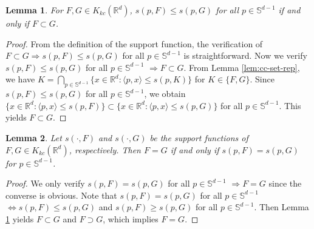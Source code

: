 \documentclass[11pt,reqno]{amsart}
\newtheorem{lemma}{Lemma}
\begin{document}
\begin{lemma}\label{lem:sf-ineq}
For $F,G \in K_{kc}(\mathbb{R}^d)$, $s(p,F)\leq s(p,G)$ for all $p \in \mathbb{S}^{d-1}$ if and only if $F \subset G$. 
\end{lemma}
\begin{proof}
From the definition of the support function, the verification of $F \subset G \Rightarrow s(p,F)\leq s(p,G)$ for all $p \in \mathbb{S}^{d-1}$ is straightforward. Now we verify $s(p,F)\leq s(p,G)$ for all $p \in \mathbb{S}^{d-1}$ $\Rightarrow F \subset G$. From Lemma \ref{lem:cc-set-rep}, we have $K = \bigcap_{p \in \mathbb{S}^{d-1}}\{x \in \mathbb{R}^d: \langle p,x \rangle \leq s(p,K)\}$ for $K \in \{F,G\}$. Since $s(p,F)\leq s(p,G)$ for all $p \in \mathbb{S}^{d-1}$, we obtain $\{x \in \mathbb{R}^{d}: \langle p, x\rangle\leq s(p,F)\} \subset \{x \in \mathbb{R}^{d}: \langle p, x\rangle\leq s(p,G)\}$ for all $p \in \mathbb{S}^{d-1}$. This yields $F \subset G$.  
\end{proof}

\begin{lemma}\label{lem:sf-cc-unique}
Let $s(\cdot, F)$ and $s(\cdot, G)$ be the support functions of $F,G \in K_{kc}(\mathbb{R}^d)$, respectively. Then  $F = G$ if and only if $s(p, F)=s(p, G)$ for $p \in \mathbb{S}^{d-1}$. 
\end{lemma}
\begin{proof}
We only verify $s(p,F)= s(p,G)$ for all $p \in \mathbb{S}^{d-1}$ $\Rightarrow F=G$ since the converse is obvious. Note that $s(p,F)= s(p,G)$ for all $p \in \mathbb{S}^{d-1}$ $\Leftrightarrow s(p, F)\leq s(p,G)$ and $s(p,F) \geq s(p,G)$ for all $p \in \mathbb{S}^{d-1}$. Then Lemma \ref{lem:sf-ineq} yields $F \subset G$ and $F \supset G$, which implies $F = G$. 
\end{proof}
\end{document}

